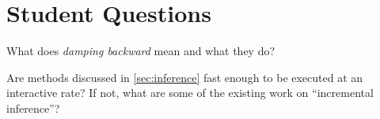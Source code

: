 \section{Student Questions}

\begin{question}
    What does {\em damping backward} mean and what they do?
\end{question}



\begin{question}
    Are methods discussed in  \cref{sec:inference}
    fast enough to be executed at an interactive rate?
    If not, what are some of the existing work on ``incremental inference''?
\end{question}


